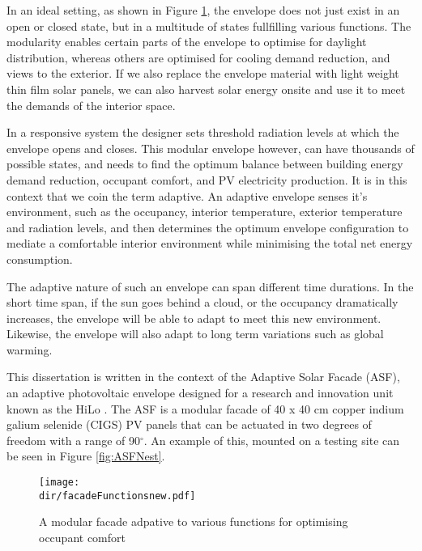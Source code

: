 
In an ideal setting, as shown in Figure \ref{fig:facadefunctions}, the envelope does not just exist in an open or closed state, but in a multitude of states fullfilling various functions. The modularity enables certain parts of the envelope to optimise for daylight distribution, whereas others are optimised for cooling demand reduction, and views to the exterior. If we also replace the envelope material with light weight thin film solar panels, we can also harvest solar energy onsite and use it to meet the demands of the interior space. 


In a responsive system the designer sets threshold radiation levels at which the envelope opens and closes. This modular envelope however, can have thousands of possible states, and needs to find the optimum balance between building energy demand reduction, occupant comfort, and PV electricity production. It is in this context that we coin the term adaptive. An adaptive envelope senses it's environment, such as the occupancy, interior temperature, exterior temperature and radiation levels, and then determines the optimum envelope configuration to mediate a comfortable interior environment while minimising the total net energy consumption. 

The adaptive nature of such an envelope can span different time durations. In the short time span, if the sun goes behind a cloud, or the occupancy dramatically increases, the envelope will be able to adapt to meet this new environment. Likewise, the envelope will also adapt to long term variations such as global warming. 

This dissertation is written in the context of the Adaptive Solar Facade (ASF), an adaptive photovoltaic envelope designed for a research and innovation unit known as the HiLo \cite{Block2017}. The ASF is a modular facade of 40 x 40 cm copper indium galium selenide (CIGS) PV panels that can be actuated in two degrees of freedom with a range of 90$^{\circ}$. An example of this, mounted on a testing site can be seen in Figure \ref{fig:ASFNest}.


\begin{figure}
\begin{center}
\texttt{[image: \\dir/facadeFunctionsnew.pdf]}
\caption{A modular facade adpative to various functions for optimising occupant comfort}
\label{fig:facadefunctions}
\end{center}
\end{figure}

